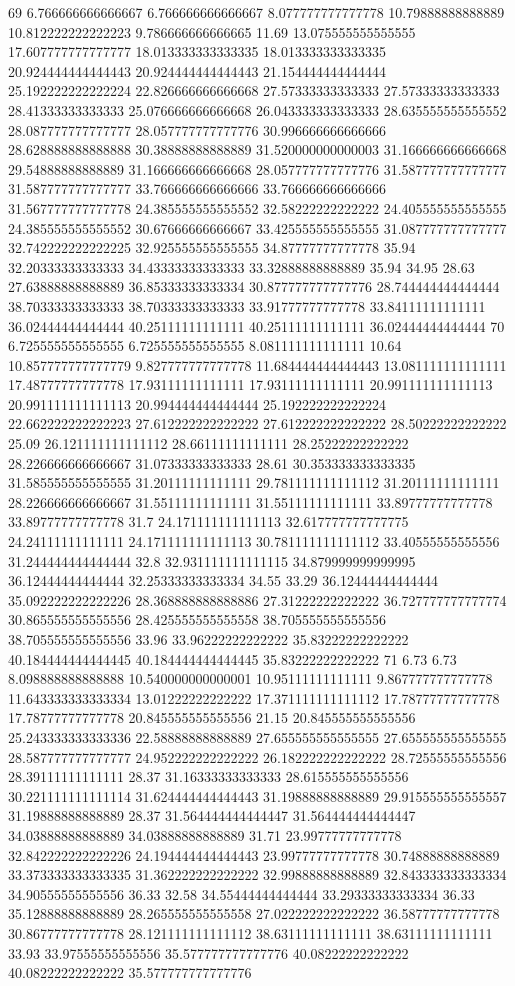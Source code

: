 69 6.766666666666667 6.766666666666667 8.077777777777778 10.79888888888889 10.812222222222223 9.786666666666665 11.69 13.075555555555555 17.607777777777777 18.013333333333335 18.013333333333335 20.924444444444443 20.924444444444443 21.154444444444444 25.192222222222224 22.826666666666668 27.57333333333333 27.57333333333333 28.41333333333333 25.076666666666668 26.043333333333333 28.635555555555552 28.087777777777777 28.057777777777776 30.996666666666666 28.628888888888888 30.38888888888889 31.520000000000003 31.166666666666668 29.54888888888889 31.166666666666668 28.057777777777776 31.587777777777777 31.587777777777777 33.766666666666666 33.766666666666666 31.567777777777778 24.385555555555552 32.58222222222222 24.405555555555555 24.385555555555552 30.67666666666667 33.425555555555555 31.087777777777777 32.742222222222225 32.925555555555555 34.87777777777778 35.94 32.20333333333333 34.43333333333333 33.32888888888889 35.94 34.95 28.63 27.63888888888889 36.85333333333334 30.877777777777776 28.744444444444444 38.70333333333333 38.70333333333333 33.91777777777778 33.84111111111111 36.02444444444444 40.25111111111111 40.25111111111111 36.02444444444444
70 6.725555555555555 6.725555555555555 8.081111111111111 10.64 10.857777777777779 9.827777777777778 11.684444444444443 13.081111111111111 17.48777777777778 17.93111111111111 17.93111111111111 20.991111111111113 20.991111111111113 20.994444444444444 25.192222222222224 22.662222222222223 27.612222222222222 27.612222222222222 28.50222222222222 25.09 26.121111111111112 28.66111111111111 28.25222222222222 28.226666666666667 31.07333333333333 28.61 30.353333333333335 31.585555555555555 31.20111111111111 29.781111111111112 31.20111111111111 28.226666666666667 31.55111111111111 31.55111111111111 33.89777777777778 33.89777777777778 31.7 24.171111111111113 32.617777777777775 24.24111111111111 24.171111111111113 30.781111111111112 33.40555555555556 31.244444444444444 32.8 32.931111111111115 34.879999999999995 36.12444444444444 32.25333333333334 34.55 33.29 36.12444444444444 35.092222222222226 28.368888888888886 27.31222222222222 36.727777777777774 30.865555555555556 28.425555555555558 38.705555555555556 38.705555555555556 33.96 33.96222222222222 35.83222222222222 40.184444444444445 40.184444444444445 35.83222222222222
71 6.73 6.73 8.098888888888888 10.540000000000001 10.95111111111111 9.867777777777778 11.643333333333334 13.01222222222222 17.371111111111112 17.78777777777778 17.78777777777778 20.845555555555556 21.15 20.845555555555556 25.243333333333336 22.58888888888889 27.655555555555555 27.655555555555555 28.587777777777777 24.952222222222222 26.182222222222222 28.72555555555556 28.39111111111111 28.37 31.16333333333333 28.615555555555556 30.221111111111114 31.624444444444443 31.19888888888889 29.915555555555557 31.19888888888889 28.37 31.564444444444447 31.564444444444447 34.03888888888889 34.03888888888889 31.71 23.99777777777778 32.842222222222226 24.194444444444443 23.99777777777778 30.74888888888889 33.373333333333335 31.362222222222222 32.99888888888889 32.843333333333334 34.90555555555556 36.33 32.58 34.55444444444444 33.29333333333334 36.33 35.12888888888889 28.265555555555558 27.022222222222222 36.58777777777778 30.86777777777778 28.121111111111112 38.63111111111111 38.63111111111111 33.93 33.97555555555556 35.577777777777776 40.08222222222222 40.08222222222222 35.577777777777776
